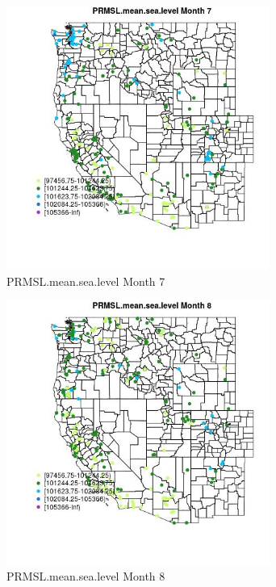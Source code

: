 \begin{figure} 
\centering  
\includegraphics[width=0.77\textwidth]{Code_Outputs/Report_ML_input_PM25_Step4_part_e_de_duplicated_aveswNAs_MapObsMo7PRMSLmeansealevel.jpg} 
\caption{\label{fig:Report_ML_input_PM25_Step4_part_e_de_duplicated_aveswNAsMapObsMo7PRMSLmeansealevel}PRMSL.mean.sea.level Month 7} 
\end{figure} 
 

\begin{figure} 
\centering  
\includegraphics[width=0.77\textwidth]{Code_Outputs/Report_ML_input_PM25_Step4_part_e_de_duplicated_aveswNAs_MapObsMo8PRMSLmeansealevel.jpg} 
\caption{\label{fig:Report_ML_input_PM25_Step4_part_e_de_duplicated_aveswNAsMapObsMo8PRMSLmeansealevel}PRMSL.mean.sea.level Month 8} 
\end{figure} 
 

